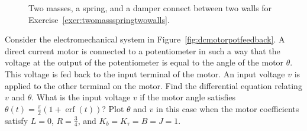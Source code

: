 \begin{excersizelist}
\begin{figure}[p]
\caption{Two masses, a spring, and a damper connect between two walls for Exercise~\ref{exer:twomassspringtwowalls}.} \label{mech:twomassspringtwowalls}
\end{figure}



\item \label{exer:dcmotorpotfeedback} Consider the electromechanical system in Figure~\ref{fig:dcmotorpotfeedback}.  A direct current motor is connected to a potentiometer in such a way that the voltage at the output of the potentiometer is equal to the angle of the motor $\theta$.  This voltage is fed back to the input terminal of the motor.  An input voltage $v$ is applied to the other terminal on the motor.  Find the differential equation relating $v$ and $\theta$.  What is the input voltage $v$ if the motor angle satisfies $\theta(t) = \frac{\pi}{2} (1 + \operatorname{erf}(t) )$?  Plot $\theta$ and $v$ in this case when the motor coefficients satisfy $L=0$, $R = \tfrac{3}{4}$, and $K_b=K_\tau=B=J=1$.


\end{excersizelist}
